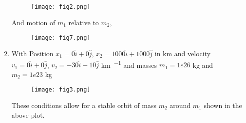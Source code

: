 \begin{enumerate}
        \begin{figure}[h!]
            \texttt{[image: fig2.png]}
            \centering
        \end{figure}

        And motion of $m_1$ relative to $m_2$,

        \begin{figure}[h!]
            \texttt{[image: fig7.png]}
            \centering
        \end{figure}


        \newpage
    \item
        With Position $x_1 = 0\hat{i} + 0\hat{j}$, $x_2 = 1000\hat{i} + 1000\hat{j}$ in \si{\km} and velocity $v_1 = 0\hat{i} + 0\hat{j}$, $v_2 = -30\hat{i} + 10\hat{j}$ \si{\km \per \sec} and masses $m_1 = 1e26$ kg and $m_2 = 1e23$ kg

        \begin{figure}[h!]
            \texttt{[image: fig3.png]}
            \centering
        \end{figure}

        These conditions allow for a stable orbit of mass $m_2$ around $m_1$ shown in the above plot.

\end{enumerate}
